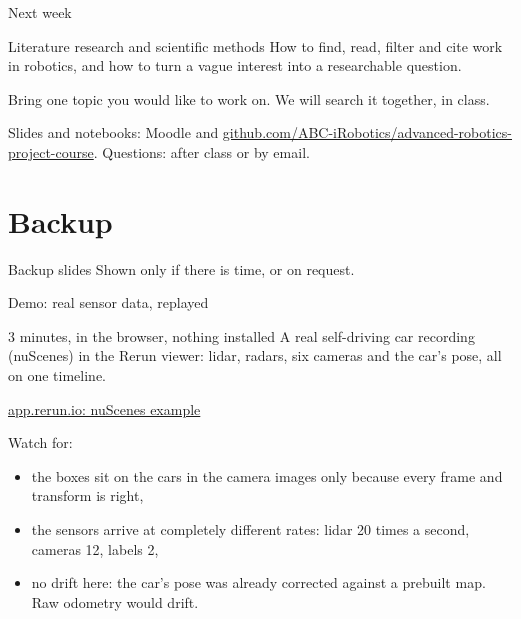 \documentclass[aspectratio=169]{beamer}
\begin{document}
\begin{frame}{Next week}
	\begin{block}{Literature research and scientific methods}
		How to find, read, filter and cite work in robotics, and how to turn a vague interest into a researchable question.
	\end{block}
	\vspace{3mm}
	Bring one topic you would like to work on. We will search it together, in class.\par
	\vspace{5mm}
	\centering \footnotesize Slides and notebooks: Moodle and \href{https://github.com/ABC-iRobotics/advanced-robotics-project-course}{\textcolor{blue!70!black}{github.com/ABC-iRobotics/advanced-robotics-project-course}}. Questions: after class or by email.
\end{frame}

\thankyouforattentionframe{}

\section{Backup}

\begin{frame}{Backup slides}
	\centering Shown only if there is time, or on request.
\end{frame}

\begin{frame}{Demo: real sensor data, replayed}
	\begin{block}{3 minutes, in the browser, nothing installed}
		A real self-driving car recording (nuScenes) in the Rerun viewer: lidar, radars, six cameras and the car's pose, all on one timeline.\\[1mm]
		{\scriptsize \href{https://app.rerun.io/version/0.37.1/?url=https://app.rerun.io/version/0.37.1/examples/nuscenes_dataset.rrd}{\textcolor{blue!70!black}{app.rerun.io: nuScenes example}}\par}
	\end{block}
	Watch for:
	\begin{itemize}
		\item the boxes sit on the cars in the camera images only because every frame and transform is right,
		\item the sensors arrive at completely different rates: lidar 20 times a second, cameras 12, labels 2,
		\item no drift here: the car's pose was already corrected against a prebuilt map. Raw odometry would drift.
	\end{itemize}
\end{frame}
\end{document}
